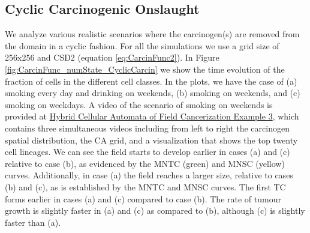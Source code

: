 \documentclass[\main/thesis.tex]{subfiles}
\begin{document}
\subsection{Cyclic Carcinogenic Onslaught}
We analyze various realistic scenarios where the carcinogen(s) are removed from the domain in a cyclic fashion. For all the simulations we use a grid size of 256x256 and CSD2 (equation \ref{eq:CarcinFunc2}). In Figure \ref{fig:CarcinFunc_numState_CyclicCarcin} we show the time evolution of the fraction of cells in the different cell classes. In the plots, we have the case of (a) smoking every day and drinking on weekends, (b) smoking on weekends, and (c) smoking on weekdays. A video of the scenario of smoking on weekends is provided at \href{https://youtu.be/4CTrhoddFOw}{Hybrid Cellular Automata of Field Cancerization Example 3}, which contains three simultaneous videos including from left to right the carcinogen spatial distribution, the CA grid, and a visualization that shows the top twenty cell lineages.  We can see the field starts to develop earlier in cases (a) and (c) relative to case (b), as evidenced by the MNTC (green) and MNSC (yellow) curves. Additionally, in case (a) the field reaches a larger size, relative to cases (b) and (c), as is established by the MNTC and MNSC curves. The first TC forms earlier in cases (a) and (c) compared to case (b). The rate of tumour growth is slightly faster in (a) and (c) as compared to (b), although (c) is slightly faster than (a).
\end{document}
